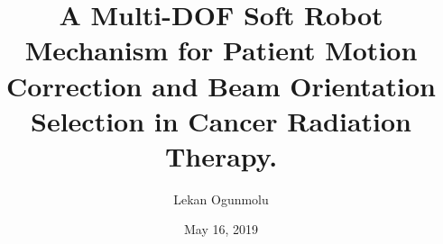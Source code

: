 \documentclass[utf8x,hyperref={pagebackref=true,citecolor=green,bookmarks=true,pdfpagelabels=false}]{beamer} %
\title{\small A Multi-DOF Soft Robot Mechanism for Patient Motion Correction and 
		Beam Orientation Selection	in Cancer Radiation Therapy.
}
\author{Lekan Ogunmolu}
\institute{
	\vspace{0.5em}
	Department of Electrical Engineering \\
	The University of Texas at Dallas, Richardson, TX 
}
\date{May 16, 2019}
\begin{document}
\frame{\titlepage
}








%


{
\tiny

}
\end{document}

